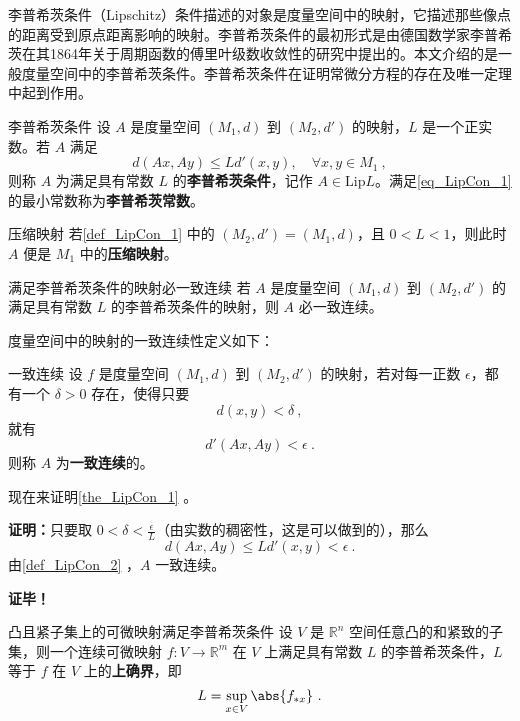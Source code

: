 
李普希茨条件（Lipschitz）条件描述的对象是度量空间中的映射，它描述那些像点的距离受到原点距离影响的映射。李普希茨条件的最初形式是由德国数学家李普希茨在其1864年关于周期函数的傅里叶级数收敛性的研究中提出的\cite{Li}。本文介绍的是一般度量空间中的李普希茨条件。李普希茨条件在证明常微分方程的存在及唯一定理中起到作用。
\begin{definition}{李普希茨条件}\label{def_LipCon_1}
设 $A$ 是度量空间 $(M_1,d)$ 到 $(M_2,d')$ 的映射，$L$ 是一个正实数。若 $A$ 满足
\begin{equation}\label{eq_LipCon_1}
d(Ax,Ay)\leq Ld'(x,y),\quad\forall x,y\in M_1~,
\end{equation}
则称 $A$ 为满足具有常数 $L$ 的\textbf{李普希茨条件}，记作 $A\in \mathrm{Lip} L$。满足\autoref{eq_LipCon_1} 的最小常数称为\textbf{李普希茨常数}。
\end{definition}
\begin{example}{压缩映射}
若\autoref{def_LipCon_1} 中的 $(M_2,d')=(M_1,d)$，且 $0<L<1$，则此时 $A$ 便是 $M_1$ 中的\textbf{压缩映射}。
\end{example}

\begin{theorem}{满足李普希茨条件的映射必一致连续}\label{the_LipCon_1}
若 $A$ 是度量空间 $(M_1,d)$ 到 $(M_2,d')$ 的满足具有常数 $L$ 的李普希茨条件的映射，则 $A$ 必一致连续。
\end{theorem}
度量空间中的映射的一致连续性定义如下：
\begin{definition}{一致连续}\label{def_LipCon_2}
设 $f$ 是度量空间 $(M_1,d)$ 到 $(M_2,d')$ 的映射，若对每一正数 $\epsilon$，都有一个 $\delta>0$ 存在，使得只要
\begin{equation}
d(x,y)<\delta~,
\end{equation}
就有
\begin{equation}
d'(Ax,Ay)<\epsilon~.
\end{equation}
则称 $A$ 为\textbf{一致连续}的。

\end{definition}
现在来证明\autoref{the_LipCon_1} 。

\textbf{证明：}只要取 $0<\delta<\frac{\epsilon}{L}$（由实数的稠密性，这是可以做到的），那么
\begin{equation}
d(Ax,Ay)\leq Ld'(x,y)< \epsilon~.
\end{equation}
由\autoref{def_LipCon_2} ，$A$ 一致连续。

\textbf{证毕！}

\begin{theorem}{凸且紧子集上的可微映射满足李普希茨条件}
设 $V$ 是 $\mathbb R^n$ 空间任意凸的和紧致的子集，则一个连续可微映射 $f:V\rightarrow \mathbb R^m$ 在 $V$ 上满足具有常数 $L$ 的李普希茨条件，$L$ 等于 $f$ 在 $V$ 上的\textbf{上确界}，即
\begin{equation}
L=\sup_{x\in V}\abs{f_{*x}}~.
\end{equation}

\end{theorem}
